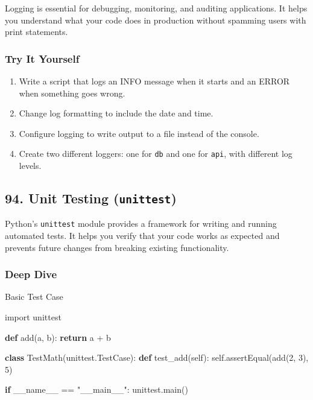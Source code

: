 \documentclass[
  letterpaper,
  DIV=11,
  numbers=noendperiod]{scrreprt}
\newenvironment{Shaded}{\begin{snugshade}}{\end{snugshade}}
\newcommand{\ControlFlowTok}[1]{\textcolor[rgb]{0.00,0.23,0.31}{\textbf{#1}}}
\newcommand{\DecValTok}[1]{\textcolor[rgb]{0.68,0.00,0.00}{#1}}
\newcommand{\ImportTok}[1]{\textcolor[rgb]{0.00,0.46,0.62}{#1}}
\newcommand{\KeywordTok}[1]{\textcolor[rgb]{0.00,0.23,0.31}{\textbf{#1}}}
\newcommand{\NormalTok}[1]{\textcolor[rgb]{0.00,0.23,0.31}{#1}}
\newcommand{\OperatorTok}[1]{\textcolor[rgb]{0.37,0.37,0.37}{#1}}
\newcommand{\StringTok}[1]{\textcolor[rgb]{0.13,0.47,0.30}{#1}}
\newcommand{\VariableTok}[1]{\textcolor[rgb]{0.07,0.07,0.07}{#1}}
\providecommand{\tightlist}{%
  \setlength{\itemsep}{0pt}\setlength{\parskip}{0pt}}
\begin{document}
Logging is essential for debugging, monitoring, and auditing
applications. It helps you understand what your code does in production
without spamming users with print statements.

\subsubsection{Try It Yourself}\label{try-it-yourself-92}

\begin{enumerate}
\def\labelenumi{\arabic{enumi}.}
\tightlist
\item
  Write a script that logs an INFO message when it starts and an ERROR
  when something goes wrong.
\item
  Change log formatting to include the date and time.
\item
  Configure logging to write output to a file instead of the console.
\item
  Create two different loggers: one for \texttt{db} and one for
  \texttt{api}, with different log levels.
\end{enumerate}

\subsection{\texorpdfstring{94. Unit Testing
(\texttt{unittest})}{94. Unit Testing (unittest)}}\label{unit-testing-unittest}

Python's \texttt{unittest} module provides a framework for writing and
running automated tests. It helps you verify that your code works as
expected and prevents future changes from breaking existing
functionality.

\subsubsection{Deep Dive}\label{deep-dive-93}

Basic Test Case

\begin{Shaded}
\begin{Highlighting}[]
\ImportTok{import}\NormalTok{ unittest}

\KeywordTok{def}\NormalTok{ add(a, b):}
    \ControlFlowTok{return}\NormalTok{ a }\OperatorTok{+}\NormalTok{ b}

\KeywordTok{class}\NormalTok{ TestMath(unittest.TestCase):}
    \KeywordTok{def}\NormalTok{ test\_add(}\VariableTok{self}\NormalTok{):}
        \VariableTok{self}\NormalTok{.assertEqual(add(}\DecValTok{2}\NormalTok{, }\DecValTok{3}\NormalTok{), }\DecValTok{5}\NormalTok{)}

\ControlFlowTok{if} \VariableTok{\_\_name\_\_} \OperatorTok{==} \StringTok{"\_\_main\_\_"}\NormalTok{:}
\NormalTok{    unittest.main()}
\end{Highlighting}
\end{Shaded}
\end{document}
